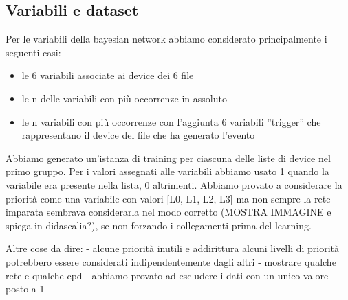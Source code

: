 \documentclass[a4paper]{article}
\begin{document}
\subsection*{Variabili e dataset}
Per le variabili della bayesian network abbiamo considerato principalmente i seguenti casi:
\begin{itemize}
\item le 6 variabili associate ai device dei 6 file
\item le n delle variabili con più occorrenze in assoluto
\item le n variabili con più occorrenze con l'aggiunta 6 variabili ''trigger'' che rappresentano il device del file che ha generato l'evento
\end{itemize}
Abbiamo generato un'istanza di training per ciascuna delle liste di device nel primo gruppo. Per i valori assegnati alle variabili abbiamo usato 1 quando la variabile era presente nella lista, 0 altrimenti. Abbiamo provato a considerare la priorità come una variabile con valori [L0, L1, L2, L3] ma non sempre la rete imparata sembrava considerarla nel modo corretto (MOSTRA IMMAGINE e spiega in didascalia?), se non forzando i collegamenti prima del learning.




Altre cose da dire:
- alcune priorità inutili e addirittura alcuni livelli di priorità potrebbero essere considerati indipendentemente dagli altri
- mostrare qualche rete e qualche cpd
- abbiamo provato ad escludere i dati con un unico valore posto a 1
\end{document}
